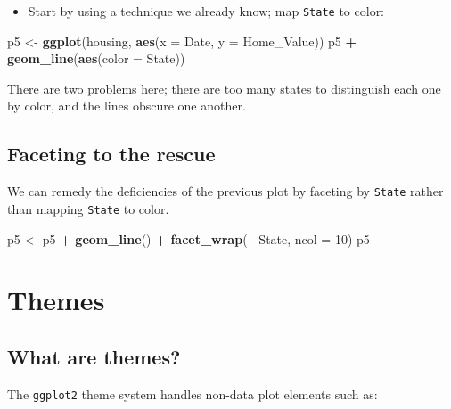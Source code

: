 \documentclass[]{book}
\newenvironment{Shaded}{\begin{snugshade}}{\end{snugshade}}
\newcommand{\KeywordTok}[1]{\textcolor[rgb]{0.13,0.29,0.53}{\textbf{#1}}}
\newcommand{\DataTypeTok}[1]{\textcolor[rgb]{0.13,0.29,0.53}{#1}}
\newcommand{\DecValTok}[1]{\textcolor[rgb]{0.00,0.00,0.81}{#1}}
\newcommand{\StringTok}[1]{\textcolor[rgb]{0.31,0.60,0.02}{#1}}
\newcommand{\OperatorTok}[1]{\textcolor[rgb]{0.81,0.36,0.00}{\textbf{#1}}}
\newcommand{\NormalTok}[1]{#1}
\providecommand{\tightlist}{%
  \setlength{\itemsep}{0pt}\setlength{\parskip}{0pt}}
\begin{document}
\begin{itemize}
\tightlist
\item
  Start by using a technique we already know; map \texttt{State} to
  color:
\end{itemize}

\begin{Shaded}
\begin{Highlighting}[]
\NormalTok{p5 <-}\StringTok{ }\KeywordTok{ggplot}\NormalTok{(housing, }\KeywordTok{aes}\NormalTok{(}\DataTypeTok{x =}\NormalTok{ Date, }\DataTypeTok{y =}\NormalTok{ Home_Value))}
\NormalTok{p5 }\OperatorTok{+}\StringTok{ }\KeywordTok{geom_line}\NormalTok{(}\KeywordTok{aes}\NormalTok{(}\DataTypeTok{color =}\NormalTok{ State))  }
\end{Highlighting}
\end{Shaded}

There are two problems here; there are too many states to distinguish
each one by color, and the lines obscure one another.

\subsection{Faceting to the rescue}\label{faceting-to-the-rescue}

We can remedy the deficiencies of the previous plot by faceting by
\texttt{State} rather than mapping \texttt{State} to color.

\begin{Shaded}
\begin{Highlighting}[]
\NormalTok{p5 <-}\StringTok{ }\NormalTok{p5 }\OperatorTok{+}\StringTok{ }\KeywordTok{geom_line}\NormalTok{() }\OperatorTok{+}
\StringTok{   }\KeywordTok{facet_wrap}\NormalTok{(}\OperatorTok{~}\StringTok{ }\NormalTok{State, }\DataTypeTok{ncol =} \DecValTok{10}\NormalTok{)}
\NormalTok{p5}
\end{Highlighting}
\end{Shaded}

\section{Themes}\label{themes}

\subsection{What are themes?}\label{what-are-themes}

The \texttt{ggplot2} theme system handles non-data plot elements such
as:
\end{document}
